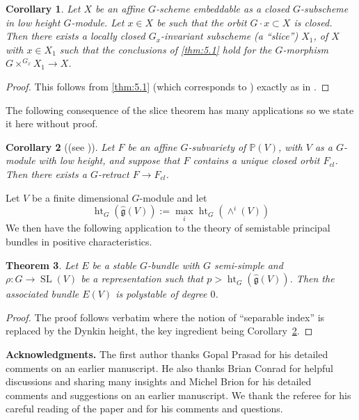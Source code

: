 \documentclass[11pt,a4paper]{article}
\theoremstyle{plain}
\newtheorem{theorem}{Theorem}[section]
\newtheorem{corollary}[theorem]{Corollary}
\theoremstyle{definition}
\DeclareMathOperator{\SL}{SL}
\DeclareMathOperator{\htG}{ht}
\newcommand{\PP}{\mathbb{P}}
\begin{document}
\begin{corollary} \label{cor:5.6}
Let $X$ be an affine $G$-scheme embeddable as a closed $G$-subscheme in low height $G$-module. Let $x \in X$ be such that the orbit $G \cdot x \subset X$ is closed. Then there exists a locally closed $G_x$-invariant subscheme (a ``slice'') $X_1$, of $X$ with $x \in X_1$ such that the conclusions of \ref{thm:5.1} hold for the $G$-morphism $G \times^{G_x} X_1 \to X$.
\end{corollary}

\begin{proof}
This follows from \ref{thm:5.1} (which corresponds to \cite[Proposition~7.4]{BR}) exactly as in \cite[Proposition~7.6]{BR}. \qedhere
\end{proof}

The following consequence of the slice theorem has many applications so we state it here without proof.

\begin{corollary}[{(see \cite[Proposition~8.5, page~312]{BR})}] \label{cor:5.7}
Let $F$ be an affine $G$-subvariety of $\PP(V)$, with $V$ as a $G$-module with low height, and suppose that $F$ contains a unique closed orbit $F_{cl}$. Then there exists a $G$-retract $F \to F_{cl}$.
\end{corollary}

Let $V$ be a finite dimensional $G$-module and let
\begin{equation} \label{eq:5.7.1}
\htG_G(\hat{\mathfrak{g}}(V)) := \max_i \htG_G(\wedge^i(V))
\end{equation}
We then have the following application to the theory of semistable principal bundles in positive characteristics.

\begin{theorem} \label{thm:5.8}
Let $E$ be a stable $G$-bundle with $G$ semi-simple and $\rho : G \to \SL(V)$ be a representation such that $p > \htG_G(\hat{\mathfrak{g}}(V))$. Then the associated bundle $E(V)$ is polystable of degree $0$.
\end{theorem}

\begin{proof}
The proof follows \cite[Theorem~9.11]{BP} verbatim where the notion of ``separable index'' is replaced by the Dynkin height, the key ingredient being Corollary~\ref{cor:5.7}. \qedhere
\end{proof}

\textbf{Acknowledgments.} The first author thanks Gopal Prasad for his detailed comments on an earlier manuscript. He also thanks Brian Conrad for helpful discussions and sharing many insights and Michel Brion for his detailed comments and suggestions on an earlier manuscript. We thank the referee for his careful reading of the paper and for his comments and questions.
\end{document}
